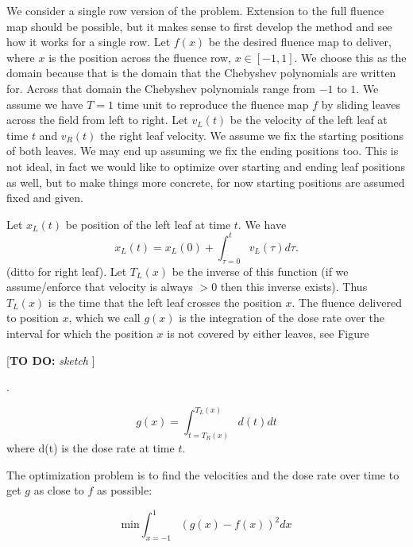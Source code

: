 \documentclass[12pt]{article}
\newcommand{\todo}[1]{{\color{lightblue}\par {[{\bf TO DO: } {\em #1}} ] \\    }}
\begin{document}
We consider a single row version of the problem. Extension to the full fluence map should be possible, but it makes sense
to first develop the method and see how it works for a single row. Let $f(x)$ be the desired fluence map to deliver, where
$x$ is the position across the fluence row, $x \in [-1,1]$. We choose this as the domain because that is the
domain that the Chebyshev polynomials are written for. Across that domain the Chebyshev polynomials range from $-1$ to $1$.
We assume we have $T=1$ time unit to reproduce the fluence map $f$ by sliding leaves across the field from left to right.
Let $v_L(t)$ be the velocity of the left leaf at time $t$ and $v_R(t)$ the right leaf velocity. We assume we fix the starting positions
of both leaves. We may end up assuming we fix the ending positions too. This is not ideal, in fact we would like to optimize over
starting and ending leaf positions as well, but to make things more concrete, for now starting positions are assumed fixed and given.

Let $x_L(t)$ be position of the left leaf at time $t$. We have
\begin{equation}
  x_L(t) = x_L(0) + \int_{\tau=0}^t v_L(\tau) d\tau.
\end{equation}
\noindent (ditto for right leaf). Let $T_L(x)$ be the inverse of this function
(if we assume/enforce that velocity is always $>0$ then this inverse exists). Thus
$T_L(x)$ is the time that the left leaf crosses the position $x$. The fluence delivered to position
$x$, which we call $g(x)$ is the integration of the dose rate over the interval for which the position $x$ is not covered by either leaves,
see Figure \todo{sketch}.


\begin{equation}
  g(x) = \int_{t = T_R(x)}^{T_L(x)} d(t) dt
\end{equation}
\noindent where d(t) is the dose rate at time $t$.

The optimization problem is to find the velocities and the dose rate over time to get $g$ as close to $f$ as possible:

\begin{equation}
\mathrm{min} \int_{x=-1}^1 \left ( g(x) - f(x) \right )^2 dx
\end{equation}
\end{document}
